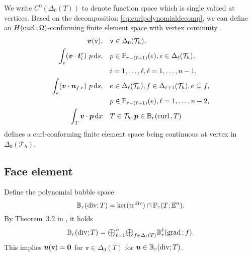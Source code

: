 \documentclass[10pt]{amsart}
\newcommand{\Oplus}{\ensuremath{\vcenter{\hbox{\scalebox{1.5}{$\oplus$}}}}}
\begin{document}
We write $C^{0}(\Delta_0(T))$ to denote function space which is single valued at vertices. Based on the decomposition \eqref{eq:curlpolynomialdecomp}, we can define an $H({\rm curl\,};\Omega)$-conforming finite element space with vertex continuity \cite{ChristiansenHuHu2018}. 
\begin{align*}
\boldsymbol v(\texttt{v}), &\quad  \texttt{v}\in \Delta_{0}(\mathcal T_h),\\
\int_e (\boldsymbol v\cdot \boldsymbol t_i^e)\ p \,{\rm d} s, &\quad  p\in \mathbb P_{r - (\ell +1)} (e), e\in \Delta_{\ell}(\mathcal T_h),\\
& \quad  i=1,\ldots, \ell, \ell = 1,\ldots, n-1, \notag\\
\int_e (\boldsymbol v\cdot \boldsymbol n_{f,e})\ p \,{\rm d} s, &\quad  e\in \Delta_{\ell}(\mathcal T_h), f\in \Delta_{\ell+1}(\mathcal T_h), e\subseteq f, \\
& \quad p\in \mathbb P_{r - (\ell +1)} (e), \ell = 1,\ldots, n-2, \notag\\
\int_T \boldsymbol v \cdot \boldsymbol p \,{\rm d}x&\quad T\in\mathcal T_h, \boldsymbol p\in \mathbb B_r({\rm curl\,}, T)
\end{align*}
defines a curl-conforming finite element space being continuous at vertex in $\Delta_{0}(\mathcal T_h)$.

\subsection{Face element}

Define the polynomial bubble space
$$
\mathbb B_r(\operatorname{div}; T) = \ker(\operatorname{tr}^{\operatorname{div}})\cap \mathbb P_r(T;\mathbb E^n).
$$
By Theorem~3.2 in \cite{Chen;Huang:2021Geometric}, it holds
$$
\mathbb B_r(\div; T) = \Oplus_{\ell=1}^n\Oplus_{f\in\Delta_{\ell}(T)}\mathbb B_{r}^{\ell}(\grad; f).
$$
This implies $\boldsymbol u(\texttt{v})=\boldsymbol0$ for $\texttt{v}\in\Delta_0(T)$ for $\boldsymbol u\in\mathbb B_r(\operatorname{div}; T)$.
\end{document}
